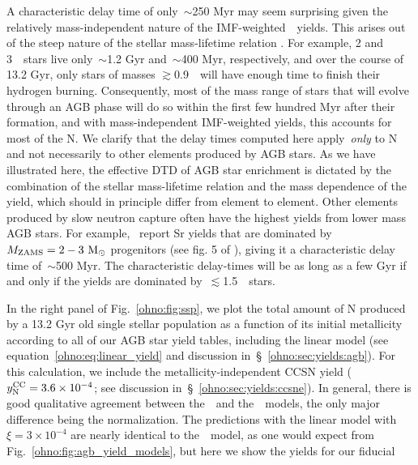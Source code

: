 A characteristic delay time of only~$\sim$250 Myr may seem surprising given
the relatively mass-independent nature of the IMF-weighted~\cristallo~yields.
This arises out of the steep nature of the stellar mass-lifetime relation
\citep[e.g.][]{Larson1974, Maeder1989, Padovani1993}.
For example, 2 and 3~\msun~stars live only~$\sim$1.2 Gyr and~$\sim$400 Myr,
respectively, and over the course of 13.2 Gyr, only stars of masses
$\gtrsim$0.9~\msun~will have enough time to finish their hydrogen burning.
Consequently, most of the mass range of stars that will evolve through an
AGB phase will do so within the first few hundred Myr after their formation,
and with mass-independent IMF-weighted yields, this accounts for most of the
N.
We clarify that the delay times computed here apply~\textit{only} to N and
not necessarily to other elements produced by AGB stars.
As we have illustrated here, the effective DTD of AGB star enrichment is
dictated by the combination of the stellar mass-lifetime relation and the
mass dependence of the yield, which should in principle differ from element to
element.
Other elements produced by slow neutron capture often have the highest yields
from lower mass AGB stars.
For example,~\citet{Cristallo2011, Cristallo2015} report Sr yields that are
dominated by~$M_\text{ZAMS} = 2 - 3~\text{M}_\odot$ progenitors (see fig. 5 of
\citealp{Johnson2020}), giving it a characteristic delay time of~$\sim$500 Myr.
The characteristic delay-times will be as long as a few Gyr if and only if the
yields are dominated by~$\lesssim$1.5~\msun~stars.
\par
In the right panel of Fig.~\ref{ohno:fig:ssp}, we plot the total amount of N
produced by a 13.2 Gyr old single stellar population as a function of its
initial metallicity according to all of our AGB star yield tables, including
the linear model (see equation~\ref{ohno:eq:linear_yield} and discussion
in~\S~\ref{ohno:sec:yields:agb}).
For this calculation, we include the metallicity-independent CCSN yield
($y_\text{N}^\text{CC} = 3.6\times10^{-4}$; see discussion in~\S~\ref{ohno:sec:yields:ccsne}).
In general, there is good qualitative agreement between the~\cristallo~and
the~\ventura~models, the only major difference being the normalization.
The predictions with the linear model with~$\xi = 3\times10^{-4}$ are nearly
identical to the~\cristallo~model, as one would expect from
Fig.~\ref{ohno:fig:agb_yield_models}, but here we show the yields for our fiducial

